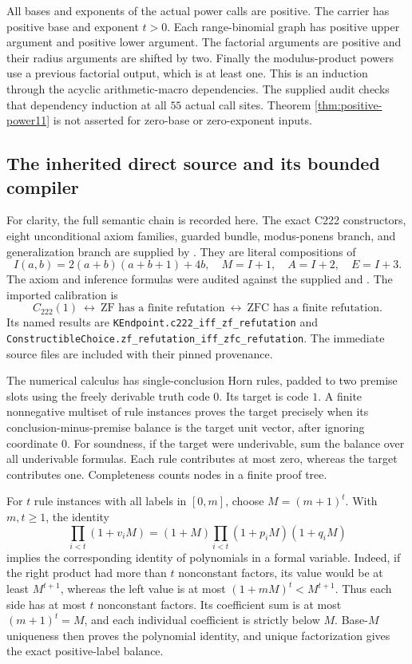 All bases and exponents of the actual power calls are positive. The
carrier has positive base and exponent $t>0$. Each range-binomial
graph has positive upper argument and positive lower argument. The
factorial arguments are positive and their radius arguments are shifted
by two. Finally the modulus-product powers use a previous factorial
output, which is at least one. This is an induction through the acyclic
arithmetic-macro dependencies. The supplied audit checks that dependency
induction at all $55$ actual call sites. Theorem
\ref{thm:positive-power11} is not asserted for zero-base or
zero-exponent inputs.

\subsection{The inherited direct source and its bounded compiler}

For clarity, the full semantic chain is recorded here. The exact C222
constructors, eight unconditional axiom families, guarded bundle,
modus-ponens branch, and generalization branch are supplied by
. They are literal compositions of
\[
 I(a,b)=2(a+b)(a+b+1)+4b,
\quad M=I+1,\quad A=I+2,\quad E=I+3.
\]
The axiom and inference formulas were audited against the supplied
 and . The imported calibration is
\[
 C_{222}(1)\ \longleftrightarrow\
 \mathrm{ZF}\text{ has a finite refutation}
 \ \longleftrightarrow\
 \mathrm{ZFC}\text{ has a finite refutation}.
\]
Its named results are
\texttt{KEndpoint.c222\_iff\_zf\_refutation} and
\texttt{ConstructibleChoice.zf\_refutation\_iff\_zfc\_refutation}.
The immediate source files are included with their pinned provenance.

The numerical calculus has single-conclusion Horn rules, padded to two
premise slots using the freely derivable truth code $0$. Its target
is code $1$. A finite nonnegative multiset of rule instances proves the
target precisely when its conclusion-minus-premise balance is the
target unit vector, after ignoring coordinate $0$. For soundness,
if the target were underivable, sum the balance over all underivable
formulas. Each rule contributes at most zero, whereas the target
contributes one. Completeness counts nodes in a finite proof tree.

For $t$ rule instances with all labels in $[0,m]$, choose
$M=(m+1)^t$. With $m,t\ge1$, the identity
\[
 \prod_{i<t}(1+v_iM)
    =(1+M)\prod_{i<t}(1+p_iM)(1+q_iM)
\]
implies the corresponding identity of polynomials in a formal variable.
Indeed, if the right product had more than $t$ nonconstant factors,
its value would be at least $M^{t+1}$, whereas the left value is
at most $(1+mM)^t<M^{t+1}$. Thus each side has at most $t$
nonconstant factors. Its coefficient sum is at most $(m+1)^t=M$,
and each individual coefficient is strictly below $M$. Base-$M$
uniqueness then proves the polynomial identity, and unique
factorization gives the exact positive-label balance.

